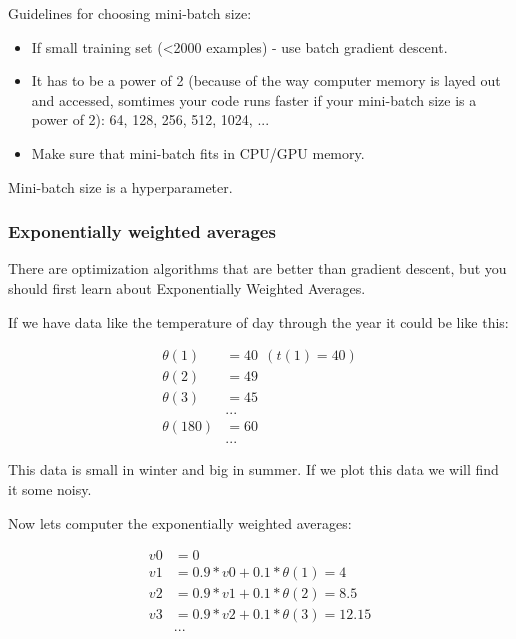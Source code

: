 Guidelines for choosing mini-batch size:
\begin{itemize}
    \item If small training set (<2000 examples) - use batch gradient descent.
    \item It has to be a power of 2 (because of the way computer memory is layed out and accessed, somtimes your code runs faster if your mini-batch size is a power of 2): 64, 128, 256, 512, 1024, ...
    \item Make sure that mini-batch fits in CPU/GPU memory.
\end{itemize}

Mini-batch size is a hyperparameter.

\subsubsection{Exponentially weighted averages}
There are optimization algorithms that are better than gradient descent, but you should first learn about Exponentially Weighted Averages.

If we have data like the temperature of day through the year it could be like this:

\begin{equation}
\begin{aligned}
\theta (1) & = 40\ \  (t(1) = 40)\\
\theta (2) &= 49\\
\theta (3) &= 45\\
&...\\
\theta (180) &= 60\\
&...
\end{aligned}
\end{equation}


This data is small in winter and big in summer. If we plot this data we will find it some noisy. 

Now lets computer the exponentially weighted averages:

\begin{equation}
    \begin{aligned}
    v0 &= 0\\
    v1 &= 0.9 * v0 + 0.1 * \theta(1) = 4\\
    v2 &= 0.9 * v1 + 0.1 * \theta(2) = 8.5\\
    v3 &= 0.9 * v2 + 0.1 * \theta(3) = 12.15\\
    &...
    \end{aligned}
\end{equation}

